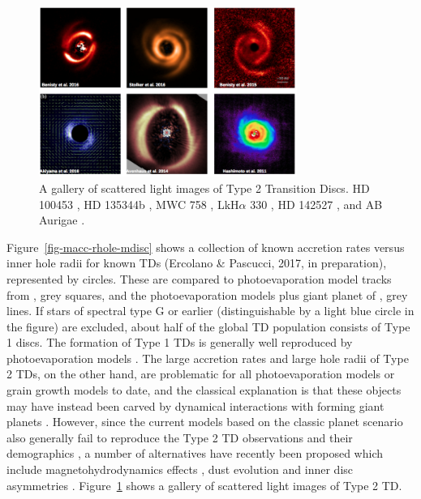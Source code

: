 \documentclass[10pt,fleqn,twoside]{article}
\begin{document}
\begin{figure}
\centerline{\includegraphics[width=0.75\textwidth]{figures/Type2TD_Scat.png}}
\caption{\label{fig-type2-scat}
  A gallery of scattered light images of Type 2 Transition Discs. 
 HD 100453 
\citep{2016arXiv161010089B}, HD 135344b \citep{2016A&A...595A.113S},
MWC 758 \citep{2015A&A...578L...6B}, LkH$\alpha$ 330 \citep{2016AJ....152..222A}, 
HD 142527 \citep{2014ApJ...781...87A}, and AB Aurigae \citep{2011ApJ...729L..17H}.} 
\end{figure}

Figure~\ref{fig-macc-rhole-mdisc} shows a collection of known accretion rates versus inner hole
radii for known TDs (Ercolano \& Pascucci, 2017, in preparation),
represented by circles. These are compared to photoevaporation model tracks from
\citet{2011MNRAS.412...13O}, grey squares, and the photoevaporation models plus giant planet
of \citet{2013MNRAS.430.1392R, 2015MNRAS.454.2173R}, grey lines. 
If stars of spectral type G or earlier (distinguishable by a light
blue circle in the figure) are excluded, about half of the global TD population consists of Type 1
discs. The formation of Type 1 TDs is generally well reproduced by
photoevaporation models \citep[e.g.,][]{2010MNRAS.401.1415O, 2011MNRAS.412...13O}.
The large accretion rates and large hole
radii of Type 2 TDs, on the other hand, are problematic for all 
photoevaporation models \citep[e.g.,][]{2013MNRAS.430.1392R, 2015MNRAS.454.2173R}
or grain
growth models \citep{2012A&A...544A..79B} to date, and the classical explanation is that
these objects may have instead been carved by dynamical interactions
with forming giant planets \citep[e.g.,][]{2011ApJ...729...47Z}. However, since the
current models based on the classic planet scenario also generally
fail to reproduce the Type 2 TD observations and 
their demographics \citep[see e.g.,][]{2016ApJ...825...77D},
a number of alternatives have recently been proposed which include magnetohydrodynamics
effects \citep[e.e.,][]{2016arXiv160907510W}, dust evolution 
\citep{2016A&A...585A..35P} and inner disc asymmetries \citep{2016ApJ...823L...8M}.
Figure~\ref{fig-type2-scat} shows a gallery of scattered light images of Type 2 TD.
\end{document}
